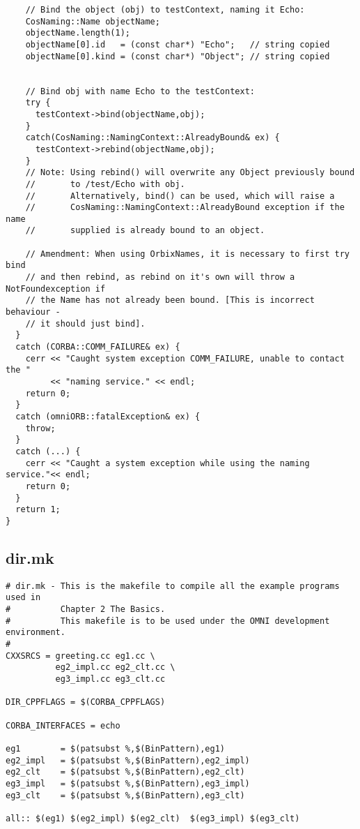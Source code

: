 \documentclass[11pt,twoside,onecolumn]{book}
\begin{document}
{\begin{verbatim}
    // Bind the object (obj) to testContext, naming it Echo:
    CosNaming::Name objectName;
    objectName.length(1);
    objectName[0].id   = (const char*) "Echo";   // string copied
    objectName[0].kind = (const char*) "Object"; // string copied


    // Bind obj with name Echo to the testContext:
    try {
      testContext->bind(objectName,obj);
    }
    catch(CosNaming::NamingContext::AlreadyBound& ex) {
      testContext->rebind(objectName,obj);
    }
    // Note: Using rebind() will overwrite any Object previously bound 
    //       to /test/Echo with obj.
    //       Alternatively, bind() can be used, which will raise a
    //       CosNaming::NamingContext::AlreadyBound exception if the name
    //       supplied is already bound to an object.

    // Amendment: When using OrbixNames, it is necessary to first try bind
    // and then rebind, as rebind on it's own will throw a NotFoundexception if
    // the Name has not already been bound. [This is incorrect behaviour -
    // it should just bind].
  }
  catch (CORBA::COMM_FAILURE& ex) {
    cerr << "Caught system exception COMM_FAILURE, unable to contact the "
         << "naming service." << endl;
    return 0;
  }
  catch (omniORB::fatalException& ex) {
    throw;
  }
  catch (...) {
    cerr << "Caught a system exception while using the naming service."<< endl;
    return 0;
  }
  return 1;
}

\end{verbatim}
\newpage
\subsection{dir.mk}
\begin{verbatim}
# dir.mk - This is the makefile to compile all the example programs used in
#          Chapter 2 The Basics.
#          This makefile is to be used under the OMNI development environment.
#
CXXSRCS = greeting.cc eg1.cc \
          eg2_impl.cc eg2_clt.cc \
          eg3_impl.cc eg3_clt.cc

DIR_CPPFLAGS = $(CORBA_CPPFLAGS)

CORBA_INTERFACES = echo

eg1        = $(patsubst %,$(BinPattern),eg1)
eg2_impl   = $(patsubst %,$(BinPattern),eg2_impl)
eg2_clt    = $(patsubst %,$(BinPattern),eg2_clt)
eg3_impl   = $(patsubst %,$(BinPattern),eg3_impl)
eg3_clt    = $(patsubst %,$(BinPattern),eg3_clt)

all:: $(eg1) $(eg2_impl) $(eg2_clt)  $(eg3_impl) $(eg3_clt)


\end{verbatim}}
\end{document}
